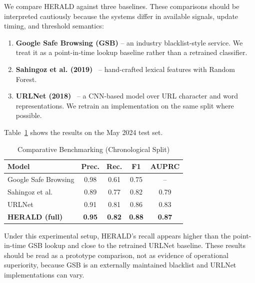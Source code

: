\documentclass[conference]{IEEEtran}
\begin{document}
We compare HERALD against three baselines. These comparisons should be interpreted cautiously because the systems differ in available signals, update timing, and threshold semantics:

\begin{enumerate}
    \item \textbf{Google Safe Browsing (GSB)} – an industry blacklist-style service. We treat it as a point-in-time lookup baseline rather than a retrained classifier.
    \item \textbf{Sahingoz et al. (2019)}~\cite{sahingoz2019} – hand-crafted lexical features with Random Forest.
    \item \textbf{URLNet (2018)}~\cite{le_urlnet} – a CNN-based model over URL character and word representations. We retrain an implementation on the same split where possible.
\end{enumerate}

Table~\ref{tab:baseline_results} shows the results on the May 2024 test set.

\begin{table}[htbp]
\centering
\caption{Comparative Benchmarking (Chronological Split)}
\label{tab:baseline_results}

\scriptsize
\setlength{\tabcolsep}{3pt}

\begin{tabularx}{\columnwidth}{lcccc}
\toprule
\textbf{Model} &
\textbf{Prec.} &
\textbf{Rec.} &
\textbf{F1} &
\textbf{AUPRC} \\
\midrule

Google Safe Browsing & 0.98 & 0.61 & 0.75 & -- \\
Sahingoz et al.~\cite{sahingoz2019} & 0.89 & 0.77 & 0.82 & 0.79 \\
URLNet~\cite{le_urlnet} & 0.91 & 0.81 & 0.86 & 0.83 \\

\textbf{HERALD (full)} &
\textbf{0.95} &
\textbf{0.82} &
\textbf{0.88} &
\textbf{0.87} \\

\bottomrule
\end{tabularx}
\end{table}

Under this experimental setup, HERALD's recall appears higher than the point-in-time GSB lookup and close to the retrained URLNet baseline. These results should be read as a prototype comparison, not as evidence of operational superiority, because GSB is an externally maintained blacklist and URLNet implementations can vary.
\end{document}
